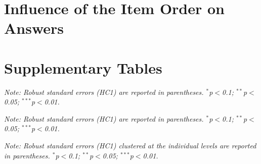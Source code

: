 \clearpage
\section{Influence of the Item Order on Answers}\label{app:order}

\begin{table}[!htbp] 
  \caption[Influence of the item order on answers]{Influence of the item order on answers.\hfill (Back~to~Section~\ref{par:data_quality}.)}\label{tab:order} 
  \makebox[\textwidth][c]{\resizebox{.98\paperwidth}{!}{}}
\end{table}

\clearpage
\section{Supplementary Tables}\label{app:tables}

\begin{table}[!htbp] 
  \caption[Effect of country coverage on support for the ICS]{Support for an International Climate Scheme depending on country coverage.\hfill (Back~to~Section~\ref{subsec:ics}.)}\label{tab:ics} 
  \makebox[\textwidth][c]{\resizebox{.98\paperwidth}{!}{}}
  {\small \textit{Note: Robust standard errors (HC1) are reported in parentheses. \hfill $^{*}$p$<$0.1; $^{**}$p$<$0.05; $^{***}$p$<$0.01.}}
\end{table}

\begin{table}[!htbp] 
  \caption[Effect of country coverage on support for the wealth tax]{Support for an international wealth tax depending on country coverage.\hfill (Back~to~Section~\ref{subsec:wealth_tax}.)}\label{tab:wealth_tax} 
  \makebox[\textwidth][c]{\resizebox{.98\paperwidth}{!}{}}
  {\small \textit{Note: Robust standard errors (HC1) are reported in parentheses. \hfill $^{*}$p$<$0.1; $^{**}$p$<$0.05; $^{***}$p$<$0.01.}}
\end{table}

\begin{table}[!htbp] 
  \caption[Conjoint analysis: effect of development aid and millionaire tax]{Effect on the likelihood that a political program is preferred of containing the following policies (compared to no foreign policy in the program).\hfill (Back~to~Section~\ref{subsec:conjoint}.)}\label{tab:conjoint} 
  \makebox[\textwidth][c]{\resizebox{.98\paperwidth}{!}{}}
  {\small \textit{Note: Robust standard errors (HC1) clustered at the individual levels are reported in parentheses. \hfill $^{*}$p$<$0.1; $^{**}$p$<$0.05; $^{***}$p$<$0.01.}}
\end{table}

